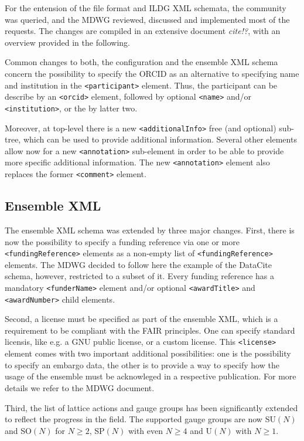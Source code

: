 \documentclass[a4paper,11pt]{article} \usepackage{pos} \usepackage{subcaption}
\begin{document}
For the entension of the file format and ILDG XML schemata, the
community was queried, and the MDWG reviewed, discussed and
implemented most of the requests. The changes are compiled in an
extensive document \emph{cite!?}, with an overview provided in the
following.

Common changes to both, the configuration and the ensemble XML schema
concern the possibility to specify the ORCID as an alternative to
specifying name and institution in the \texttt{<participant>}
element. Thus, the participant can be describe by an \texttt{<orcid>}
element, followed by optional \texttt{<name>} and/or
\texttt{<institution>}, or the by latter two.

Moreover, at top-level there is a new
\texttt{<additionalInfo>} free (and optional) sub-tree, which can be
used to provide additional information. Several other elements allow
now for a new \texttt{<annotation>} sub-element in order to be able to
provide more specific additional information. The new
\texttt{<annotation>} element also replaces the former
\texttt{<comment>} element.

\subsection{Ensemble XML}

The ensemble XML schema was extended by three major changes. First,
there is now the possibility to specify a funding reference via one or
more \texttt{<fundingReference>} elements as a non-empty list of
\texttt{<fundingReference>} elements. The MDWG decided to follow
here the example of the DataCite schema, however, restricted to a
subset of it. Every funding reference has a mandatory
\texttt{<funderName>} element and/or optional \texttt{<awardTitle>}
and \texttt{<awardNumber>} child elements.

Second, a license must be specified as part of the ensemble XML, which
is a requirement to be compliant with the FAIR principles. One can
specify standard licensis, like e.g. a GNU public license, or a custom
license. This \texttt{<license>} element comes with two important
additional possibilities: one is the possibility to specify an embargo
data, the other is to provide a way to specify how the usage of the
ensemble must be acknowleged in a respective publication.
For more details we refer to the MDWG document.

Third, the list of lattice actions and gauge groups has been
significantly extended to reflect the progress in the field. The
supported gauge groups are now SU$(N)$ and SO$(N)$ for $N\geq 2$,
SP$(N)$ with even $N\geq 4$ and U$(N)$ with $N\geq1$.
\end{document}
